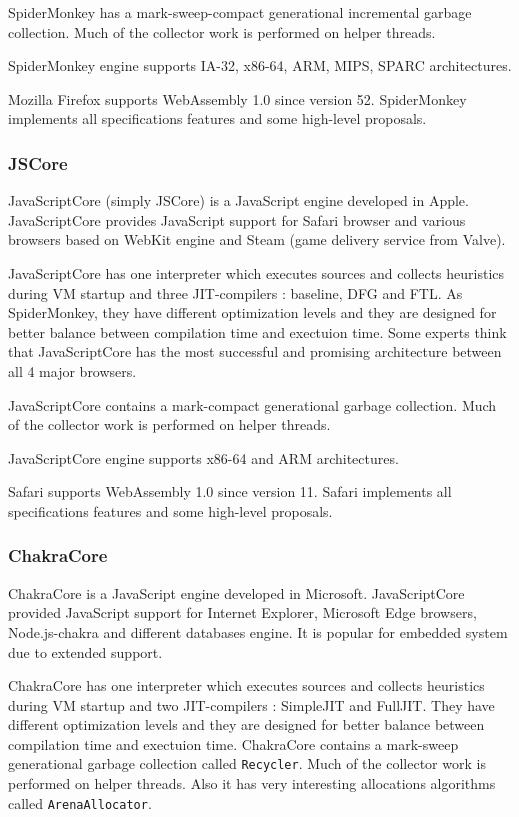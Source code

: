 SpiderMonkey has a mark-sweep-compact generational incremental garbage collection. Much of the collector work is performed on helper threads.

SpiderMonkey engine supports IA-32, x86-64, ARM, MIPS, SPARC architectures.

Mozilla Firefox supports WebAssembly 1.0 since version 52. SpiderMonkey implements all specifications features and some high-level proposals.

\subsubsection{JSCore} \mbox{}

JavaScriptCore (simply JSCore) is a JavaScript engine developed in Apple. 
JavaScriptCore provides JavaScript support for Safari browser and various browsers based on WebKit engine and Steam (game delivery service from Valve).

JavaScriptCore has one interpreter which executes sources and collects heuristics during VM startup and three JIT-compilers : baseline, DFG and FTL.
As SpiderMonkey, they have different optimization levels and they are designed for better balance between compilation time and exectuion time.
Some experts think that JavaScriptCore has the most successful and promising architecture between all 4 major browsers.

JavaScriptCore contains a mark-compact generational garbage collection. Much of the collector work is performed on helper threads.

JavaScriptCore engine supports x86-64 and ARM architectures.

Safari supports WebAssembly 1.0 since version 11. Safari implements all specifications features and some high-level proposals.

\subsubsection{ChakraCore} \mbox{}

ChakraCore is a JavaScript engine developed in Microsoft. 
JavaScriptCore provided JavaScript support for Internet Explorer, Microsoft Edge browsers, Node.js-chakra and different databases engine.
It is popular for embedded system due to extended support.

ChakraCore has one interpreter which executes sources and collects heuristics during VM startup and two JIT-compilers : SimpleJIT and FullJIT.
They have different optimization levels and they are designed for better balance between compilation time and exectuion time.
ChakraCore contains a mark-sweep generational garbage collection called \texttt{Recycler}. Much of the collector work is performed on helper threads.
Also it has very interesting allocations algorithms called \texttt{ArenaAllocator}.

